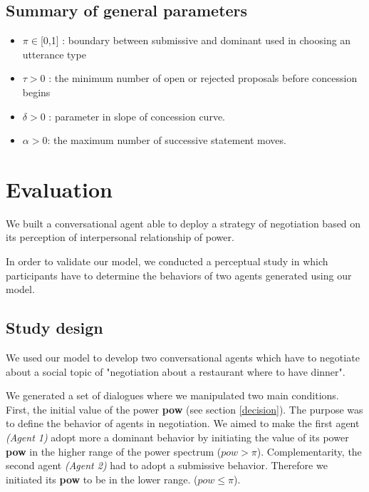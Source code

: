 \documentclass{llncs}
\begin{document}
	\subsection{Summary of general parameters }
	\begin{itemize}[noitemsep]
	
	\item $\pi \in $[0,1] : boundary between submissive and dominant used in
	choosing an utterance type
	\item $\tau > 0$ : the minimum number of open or rejected proposals before concession begins
	\item $\delta > 0$ : parameter in slope of concession curve.
	\item $\alpha> 0$: the maximum number of successive statement moves.
	
	
	\end{itemize}
	
	
	
	\section{Evaluation}
	
	We built a conversational agent able to deploy a strategy of negotiation based on its perception of interpersonal relationship of power. 
	
	In order to validate our model, we conducted a perceptual study in which participants have to determine the behaviors of two agents generated using our model. 
	
	\subsection{Study design}
	We used our model to develop two conversational agents which have to negotiate about a social topic of "negotiation about a restaurant where to have dinner".
	
	We generated a set of dialogues where we manipulated two main conditions. First, the initial value of the power \textbf{pow} (see section \ref{decision}). The purpose was to define the behavior of agents in negotiation.
	We aimed to make the first agent \emph{(Agent 1)} adopt more a dominant behavior by initiating the value of its power \textbf{pow} in the higher range of the power spectrum ($pow>\pi$). Complementarity, the second agent \emph{(Agent 2)} had to adopt a submissive behavior. Therefore we initiated its \textbf{pow} to be in the lower range. ($ pow\leq \pi$).
	
\end{document}

